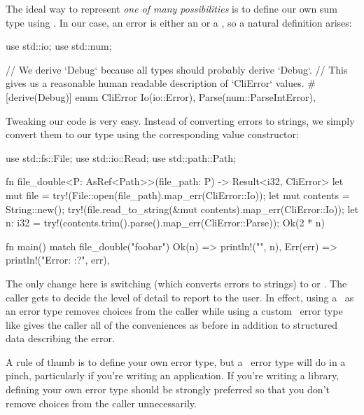 \blank

The ideal way to represent \emph{one of many possibilities} is to define our own sum type using \enum. In our case, an error 
is either an  or a , so a natural definition arises:

\begin{rustc}
use std::io;
use std::num;

// We derive `Debug` because all types should probably derive `Debug`.
// This gives us a reasonable human readable description of `CliError` values.
#[derive(Debug)]
enum CliError {
    Io(io::Error),
    Parse(num::ParseIntError),
}
\end{rustc}

Tweaking our code is very easy. Instead of converting errors to strings, we simply convert them to our  type 
using the corresponding value constructor:

\begin{rustc}
use std::fs::File;
use std::io::Read;
use std::path::Path;

fn file_double<P: AsRef<Path>>(file_path: P) -> Result<i32, CliError> {
    let mut file = try!(File::open(file_path).map_err(CliError::Io));
    let mut contents = String::new();
    try!(file.read_to_string(&mut contents).map_err(CliError::Io));
    let n: i32 = try!(contents.trim().parse().map_err(CliError::Parse));
    Ok(2 * n)
}

fn main() {
    match file_double("foobar") {
        Ok(n) => println!("{}", n),
        Err(err) => println!("Error: {:?}", err),
    }
}
\end{rustc}

The only change here is switching  (which converts errors to strings) to 
 or . The caller gets to decide the level of detail to report 
to the user. In effect, using a \String\ as an error type removes choices from the caller while using a custom \enum\ error 
type like  gives the caller all of the conveniences as before in addition to structured data describing the 
error.

\blank

A rule of thumb is to define your own error type, but a \String\ error type will do in a pinch, particularly if you're 
writing an application. If you're writing a library, defining your own error type should be strongly preferred so that 
you don't remove choices from the caller unnecessarily.

